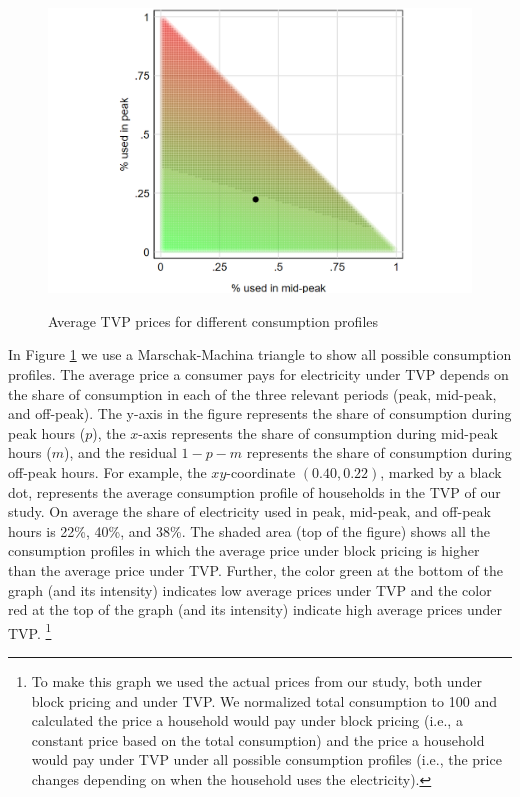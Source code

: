 \begin{figure}[ht]
  \caption{Average TVP prices for different consumption profiles}\label{fig:marschak}
  \begin{center}
  {\includegraphics[width=1\textwidth]{./figures/marschak.png}}
  \end{center}
  \fnote{}
\end{figure}

In Figure \ref{fig:marschak} we use a Marschak-Machina triangle to show all possible consumption profiles. The average price a consumer pays for electricity under TVP depends on the share of consumption in each of the three relevant periods (peak, mid-peak, and off-peak). The y-axis in the figure represents the share of consumption during peak hours ($p$), the $x$-axis represents the share of consumption during mid-peak hours ($m$), and the residual $1-p-m$ represents the share of consumption during off-peak hours. For example, the $xy$-coordinate $(0.40,0.22)$, marked by a black dot, represents the average consumption profile of households in the TVP of our study. On average the share of electricity used in peak, mid-peak, and off-peak hours is 22\%, 40\%, and 38\%. The shaded area (top of the figure) shows all the consumption profiles in which the average price under block pricing is higher than the average price under TVP. Further, the color green at the bottom of the graph (and its intensity) indicates low average prices under TVP and the color red at the top of the graph (and its intensity) indicate high average prices under TVP. \footnote{To make this graph we used the actual prices from our study, both under block pricing and under TVP. We normalized total consumption to 100 and calculated the price a household would pay under block pricing (i.e., a constant price based on the total consumption) and the price a household would pay under TVP under all possible consumption profiles (i.e., the price changes depending on when the household uses the electricity).}

